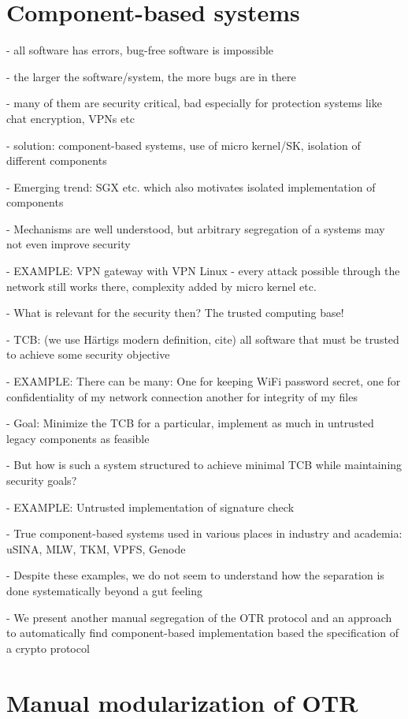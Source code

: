 \documentclass[a4paper]{article}
\begin{document}
\section{\label{sec:cbs}Component-based systems}

- all software has errors, bug-free software is impossible

- the larger the software/system, the more bugs are in there

- many of them are security critical, bad especially for protection systems like chat encryption, VPNs etc


- solution: component-based systems, use of micro kernel/SK, isolation of different components

- Emerging trend: SGX etc. which also motivates isolated implementation of components

- Mechanisms are well understood, but arbitrary segregation of a systems may not even improve security

- EXAMPLE: VPN gateway with VPN Linux - every attack possible through the network still works there, complexity added by micro kernel etc.


- What is relevant for the security then? The trusted computing base!

- TCB: (we use Härtigs modern definition, cite) all software that must be trusted to achieve some security objective

- EXAMPLE: There can be many: One for keeping WiFi password secret, one for confidentiality of my network connection another for integrity of my files


- Goal: Minimize the TCB for a particular, implement as much in untrusted legacy components as feasible

- But how is such a system structured to achieve minimal TCB while maintaining security goals?

- EXAMPLE: Untrusted implementation of signature check

- True component-based systems used in various places in industry and academia: uSINA, MLW, TKM, VPFS, Genode

- Despite these examples, we do not seem to understand how the separation is done systematically beyond a gut feeling

- We present another manual segregation of the OTR protocol and an approach to automatically find component-based implementation based the specification of a crypto protocol

\section{\label{sec:manual_modularization}Manual modularization of OTR}
\end{document}
